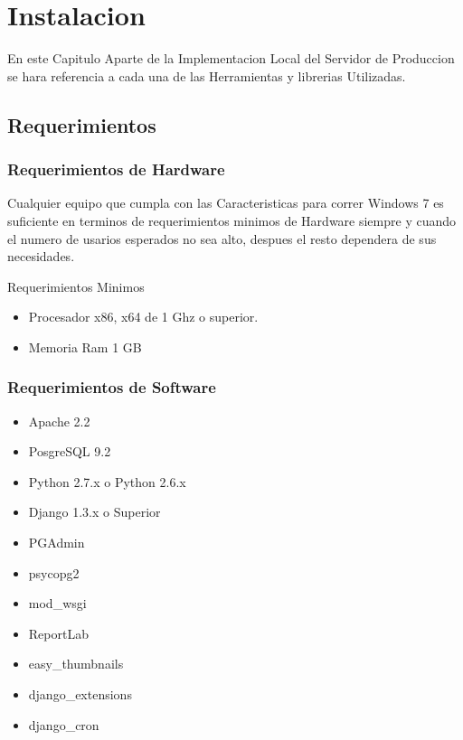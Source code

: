 \chapter{Instalacion}

En este Capitulo Aparte de la Implementacion Local del Servidor de Produccion se
hara referencia a cada una de las Herramientas y librerias Utilizadas.

\section{Requerimientos}

\subsection{Requerimientos de Hardware}

Cualquier equipo que cumpla con las Caracteristicas para correr Windows 7 es suficiente
en terminos de requerimientos minimos de Hardware siempre y cuando el numero de usarios
esperados no sea alto, despues el resto dependera de sus necesidades.

\large Requerimientos Minimos

\begin{itemize}
    \item Procesador x86, x64 de 1 Ghz o superior.
    \item Memoria Ram 1 GB
\end{itemize}


\subsection{Requerimientos de Software}


\begin{itemize}
    \item Apache 2.2
    \item PosgreSQL 9.2
    \item Python 2.7.x o Python 2.6.x
    \item Django 1.3.x o Superior
    \item PGAdmin
    \item psycopg2
    \item mod\_wsgi
    \item ReportLab
    \item easy\_thumbnails
    \item django\_extensions
    \item django\_cron
\end{itemize}


